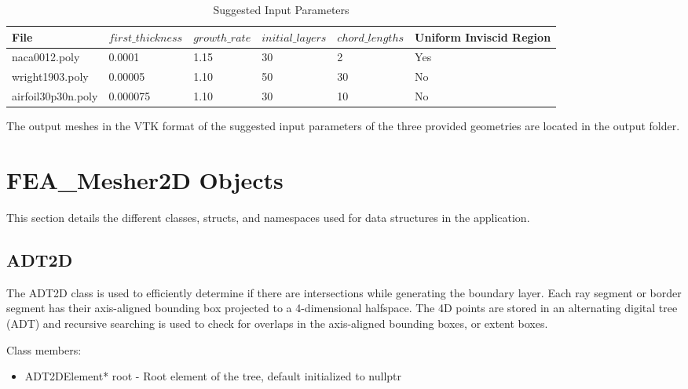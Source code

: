 \documentclass[manuscript, screen]{acmart}
\begin{document}
\begin{table}
 \begin{tabularx}{\textwidth}{|| X | l | l | l | l | l ||} 
 \hline
 File & $first\_thickness$ & $growth\_rate$ & $initial\_layers$ & $chord\_lengths$ & Uniform Inviscid Region \\ [0.5ex] 
 \hline\hline
\hline 
naca0012.poly & 0.0001 & 1.15 & 30 & 2 & Yes \\ [1ex] 
\hline
wright1903.poly & 0.00005 & 1.10 & 50 & 30 & No \\ [1ex] 
\hline
airfoil30p30n.poly & 0.000075 & 1.10 & 30 & 10 & No \\ [1ex] 
\hline
\end{tabularx}
\caption{Suggested Input Parameters}
\label{input_suggestions}
\end{table}

The output meshes in the VTK format of the suggested input parameters of the three provided geometries are located in the output folder.

\section{FEA\_Mesher2D Objects}
This section details the different classes, structs, and namespaces used for data structures in the application.

\subsection{ADT2D}
The ADT2D class is used to efficiently determine if there are intersections while generating the boundary layer. Each ray segment or border segment has their axis-aligned bounding box projected to a 4-dimensional halfspace. The 4D points are stored in an alternating digital tree (ADT) and recursive searching is used to check for overlaps in the axis-aligned bounding boxes, or extent boxes.

Class members:
\begin{itemize}
\item ADT2DElement* root - Root element of the tree, default initialized to nullptr
\end{itemize}
\end{document}
